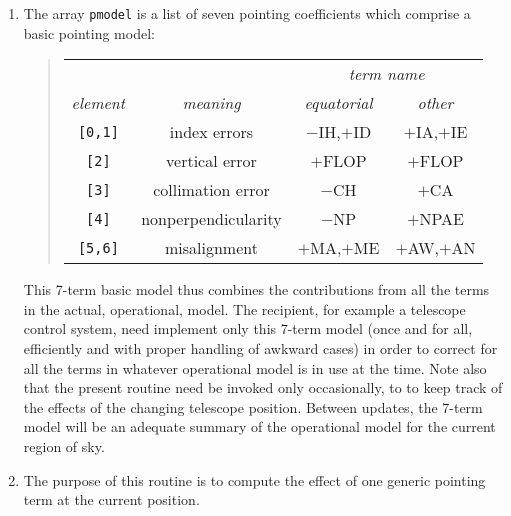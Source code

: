 \documentclass[12pt,fleqn,twoside]{article}
\renewcommand{\_}{{\tt\char'137}}     %
\newcommand{\mhadec}     {$[\,-h,\delta\,]$}
\begin{document}
{\begin{enumerate}
      The {\tt vc} \mhadec\ vector is the direction to which the correction
      is being applied.
\item The array {\tt pmodel} is a list of seven pointing coefficients
      which comprise a basic pointing model:
      \begin{quote}
      \begin{tabular}{cccc}
      & & \multicolumn{2}{c}{\it term name} \\
      {\it element} & {\it meaning} & {\it equatorial} & {\it other} \\[1ex]
      {\tt [0,1]} & index errors & $-$IH,$+$ID & $+$IA,$+$IE \\
      {\tt [2]} & vertical error & $+$FLOP & $+$FLOP \\
      {\tt [3]} & collimation error & $-$CH & $+$CA \\
      {\tt [4]} & nonperpendicularity & $-$NP & $+$NPAE \\
      {\tt [5,6]} & misalignment & $+$MA,$+$ME & $+$AW,$+$AN \\
      \end{tabular}
      \end{quote}
      This 7-term basic model thus combines the contributions from all
      the terms in the actual, operational, model.  The recipient, for
      example a telescope control system, need implement only this
      7-term model (once and for all, efficiently and with proper
      handling of awkward cases) in order to correct for all the terms
      in whatever operational model is in use at the time.  Note also
      that the present routine need be invoked only occasionally, to
      to keep track of the effects of the changing telescope position.
      Between updates, the 7-term model will be an adequate summary of
      the operational model for the current region of sky.
\item The purpose of this routine is to compute the effect of
      one generic pointing term at the current position.


\end{enumerate}}
\end{document}
